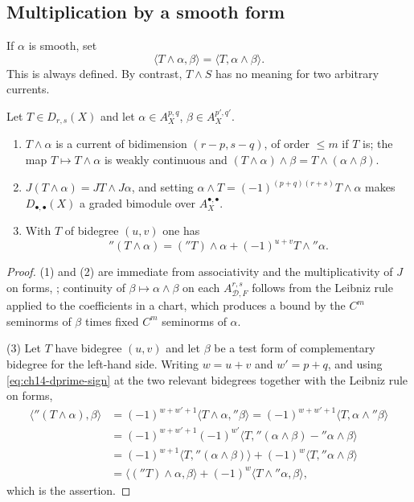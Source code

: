 \subsection{Multiplication by a smooth form}
\label{sec:ch14-wedge-smooth}

If $\alpha$ is smooth, set
\[
               \langle T\wedge\alpha,\beta\rangle
                =\langle T,\alpha\wedge\beta\rangle.
\]
This is always defined.  By contrast, $T\wedge S$ has no meaning for two
arbitrary currents.

\begin{lemma}
\label{lem:ch14-module-leibniz}
Let $T\in D_{r,s}(X)$ and let $\alpha\in A_X^{p,q}$, $\beta\in A_X^{p',q'}$.
\begin{enumerate}
\item $T\wedge\alpha$ is a current of bidimension $(r-p,s-q)$, of order
  $\le m$ if $T$ is; the map $T\mapsto T\wedge\alpha$ is weakly continuous and
  $(T\wedge\alpha)\wedge\beta=T\wedge(\alpha\wedge\beta)$.
\item $J(T\wedge\alpha)=JT\wedge J\alpha$, and setting
  $\alpha\wedge T=(-1)^{(p+q)(r+s)}T\wedge\alpha$ makes
  $D_{\bullet,\bullet}(X)$ a graded bimodule over
  $A_X^{\bullet,\bullet}$.
\item With $T$ of bidegree $(u,v)$ one has
  \[
   \dprime(T\wedge\alpha)=(\dprime T)\wedge\alpha
    +(-1)^{u+v}T\wedge\dprime\alpha .
  \]
\end{enumerate}
\end{lemma}

\begin{proof}
(1) and (2) are immediate from associativity and the multiplicativity of $J$
on forms, ; continuity of
$\beta\mapsto\alpha\wedge\beta$ on each $A^{r,s}_{\mathscr D,F}$ follows from
the Leibniz rule applied to the coefficients in a chart, which produces a
bound by the $C^m$ seminorms of $\beta$ times fixed $C^m$ seminorms of
$\alpha$.

(3) Let $T$ have bidegree $(u,v)$ and let $\beta$ be a test form of
complementary bidegree for the left-hand side.  Writing $w=u+v$ and
$w'=p+q$, and using \eqref{eq:ch14-dprime-sign} at the two relevant
bidegrees together with the Leibniz rule on forms,
\[
\begin{aligned}
 \langle\dprime(T\wedge\alpha),\beta\rangle
 &=(-1)^{w+w'+1}\langle T\wedge\alpha,\dprime\beta\rangle
  =(-1)^{w+w'+1}\langle T,\alpha\wedge\dprime\beta\rangle\\
 &=(-1)^{w+w'+1}(-1)^{w'}
   \bigl\langle T,\dprime(\alpha\wedge\beta)-\dprime\alpha\wedge\beta
   \bigr\rangle\\
 &=(-1)^{w+1}\langle T,\dprime(\alpha\wedge\beta)\rangle
   +(-1)^{w}\langle T,\dprime\alpha\wedge\beta\rangle\\
 &=\langle(\dprime T)\wedge\alpha,\beta\rangle
   +(-1)^{w}\langle T\wedge\dprime\alpha,\beta\rangle,
\end{aligned}
\]
which is the assertion.
\end{proof}

